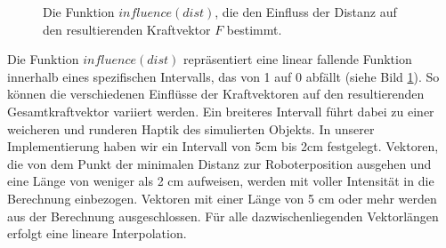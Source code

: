 \documentclass[conference]{IEEEtran}
\begin{document}
\begin{figure}[h]
    \centering
    \caption{Die Funktion $influence(dist)$, die den Einfluss der Distanz auf den resultierenden Kraftvektor $F$ bestimmt.}
    \label{fig:influence}
\end{figure}

Die Funktion $influence(dist)$ repräsentiert eine linear fallende Funktion innerhalb eines spezifischen Intervalls, das von 1 auf 0 abfällt (siehe Bild \ref{fig:influence}). So können die verschiedenen Einflüsse der Kraftvektoren auf den resultierenden Gesamtkraftvektor variiert werden. Ein breiteres Intervall führt dabei zu einer weicheren und runderen Haptik des simulierten Objekts. In unserer Implementierung haben wir ein Intervall von 5cm bis 2cm festgelegt. Vektoren, die von dem Punkt der minimalen Distanz zur Roboterposition ausgehen und eine Länge von weniger als 2 cm aufweisen, werden mit voller Intensität in die Berechnung einbezogen. Vektoren mit einer Länge von 5 cm oder mehr werden aus der Berechnung ausgeschlossen. Für alle dazwischenliegenden Vektorlängen erfolgt eine lineare Interpolation.
\end{document}
